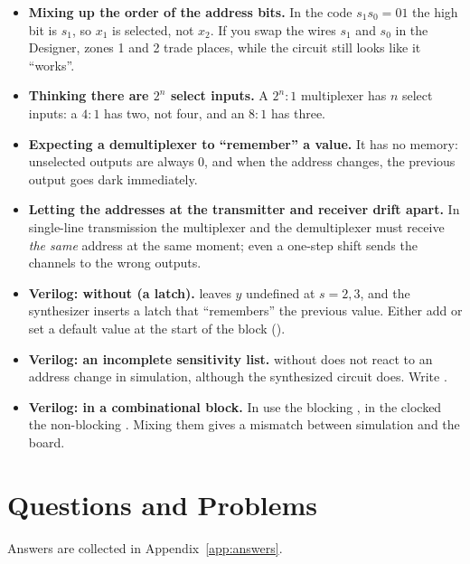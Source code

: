 \begin{warnbox}
\begin{itemize}
  \item \textbf{Mixing up the order of the address bits.} In the code $s_1s_0=01$ the high bit is $s_1$, so $x_1$ is selected, not $x_2$. If you swap the wires $s_1$ and $s_0$ in the Designer, zones 1 and 2 trade places, while the circuit still looks like it ``works''.
  \item \textbf{Thinking there are $2^n$ select inputs.} A $2^n{:}1$ multiplexer has $n$ select inputs: a $4{:}1$ has two, not four, and an $8{:}1$ has three.
  \item \textbf{Expecting a demultiplexer to ``remember'' a value.} It has no memory: unselected outputs are always 0, and when the address changes, the previous output goes dark immediately.
  \item \textbf{Letting the addresses at the transmitter and receiver drift apart.} In single-line transmission the multiplexer and the demultiplexer must receive \emph{the same} address at the same moment; even a one-step shift sends the channels to the wrong outputs.
  \item \textbf{Verilog:  without  (a latch).}
     leaves $y$
    undefined at $s=2,3$, and the synthesizer inserts a latch that ``remembers''
    the previous value. Either add  or set a default value at the
    start of the block ().
  \item \textbf{Verilog: an incomplete sensitivity list.}
     without  does not react to an address change
    in simulation, although the synthesized circuit does. Write
    .
  \item \textbf{Verilog: \code{<=} in a combinational block.} In
     use the blocking \code{=}, in the clocked
     the non-blocking \code{<=}. Mixing them gives a
    mismatch between simulation and the board.
\end{itemize}
\end{warnbox}

\section{Questions and Problems}
\label{sec:tasks-mux}

Answers are collected in Appendix~\ref{app:answers}.

